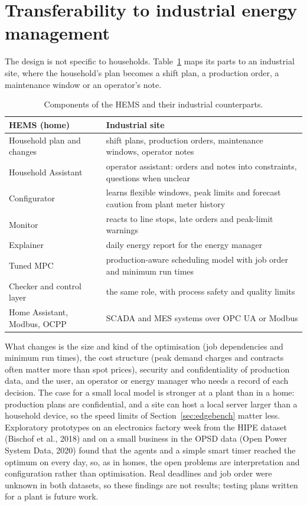 \documentclass[12pt,a4paper]{report}
\begin{document}
\section{Transferability to industrial energy management}
\label{sec:industry}

The design is not specific to households. Table~\ref{tab:industry} maps
its parts to an industrial site, where the household's plan becomes a
shift plan, a production order, a maintenance window or an operator's
note.

\begin{table}[htbp]
\caption{Components of the HEMS and their industrial counterparts.}
\label{tab:industry}
\small
\begin{tabularx}{\textwidth}{@{}p{4.2cm}X@{}}
\toprule
HEMS (home) & Industrial site \\
\midrule
Household plan and changes & shift plans, production orders, maintenance windows, operator notes \\
Household Assistant & operator assistant: orders and notes into constraints, questions when unclear \\
Configurator & learns flexible windows, peak limits and forecast caution from plant meter history \\
Monitor & reacts to line stops, late orders and peak-limit warnings \\
Explainer & daily energy report for the energy manager \\
Tuned MPC & production-aware scheduling model with job order and minimum run times \\
Checker and control layer & the same role, with process safety and quality limits \\
Home Assistant, Modbus, OCPP & SCADA and MES systems over OPC UA or Modbus \\
\bottomrule
\end{tabularx}
\end{table}

What changes is the size and kind of the optimisation (job dependencies
and minimum run times), the cost structure (peak demand charges and
contracts often matter more than spot prices), security and
confidentiality of production data, and the user, an operator or energy
manager who needs a record of each decision. The case for a small
local model is stronger at a plant than in a home: production plans are
confidential, and a site can host a local server larger than a
household device, so the speed limits of Section~\ref{sec:edgebench}
matter less. Exploratory prototypes on an electronics factory week from
the HIPE dataset (Bischof et al., 2018) and on a small business in the
OPSD data (Open Power System Data, 2020) found that the agents and a simple smart
timer reached the optimum on every day, so, as in homes, the open
problems are interpretation and configuration rather than optimisation.
Real deadlines and job order were unknown in both datasets, so these
findings are not results; testing plans written for a plant is future
work.
\end{document}
